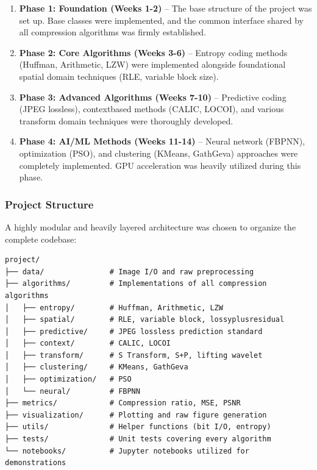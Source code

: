 \begin{enumerate}
    \item \textbf{Phase 1: Foundation (Weeks 1-2)} – The base structure of the project was set up. Base classes were implemented, and the common interface shared by all compression algorithms was firmly established.
    
    \item \textbf{Phase 2: Core Algorithms (Weeks 3-6)} – Entropy coding methods (Huffman, Arithmetic, LZW) were implemented alongside foundational spatial domain techniques (RLE, variable block size).
    
    \item \textbf{Phase 3: Advanced Algorithms (Weeks 7-10)} – Predictive coding (JPEG lossless), contextbased methods (CALIC, LOCOI), and various transform domain techniques were thoroughly developed.
    
    \item \textbf{Phase 4: AI/ML Methods (Weeks 11-14)} – Neural network (FBPNN), optimization (PSO), and clustering (KMeans, GathGeva) approaches were completely implemented. GPU acceleration was heavily utilized during this phase.
\end{enumerate}

\subsubsection{Project Structure}

A highly modular and heavily layered architecture was chosen to organize the complete codebase:

\begin{verbatim}
project/
├── data/               # Image I/O and raw preprocessing
├── algorithms/         # Implementations of all compression algorithms
│   ├── entropy/        # Huffman, Arithmetic, LZW
│   ├── spatial/        # RLE, variable block, lossyplusresidual
│   ├── predictive/     # JPEG lossless prediction standard
│   ├── context/        # CALIC, LOCOI
│   ├── transform/      # S Transform, S+P, lifting wavelet
│   ├── clustering/     # KMeans, GathGeva
│   ├── optimization/   # PSO
│   └── neural/         # FBPNN
├── metrics/            # Compression ratio, MSE, PSNR
├── visualization/      # Plotting and raw figure generation
├── utils/              # Helper functions (bit I/O, entropy)
├── tests/              # Unit tests covering every algorithm
└── notebooks/          # Jupyter notebooks utilized for demonstrations
\end{verbatim}




